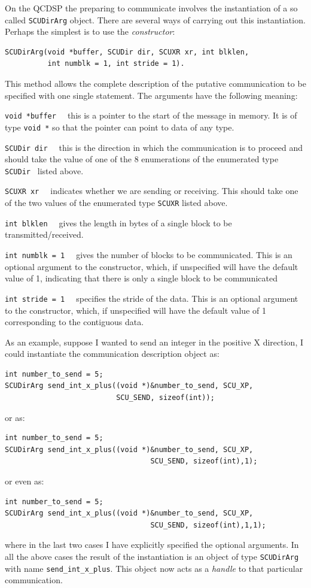 On the QCDSP the preparing to communicate involves the instantiation
of a so called {\tt SCUDirArg} object. There are several ways of
carrying out this instantiation. Perhaps the simplest is to use the
{\em constructor}: 
{\small \begin{verbatim} 
SCUDirArg(void *buffer, SCUDir dir, SCUXR xr, int blklen, 
          int numblk = 1, int stride = 1).
\end{verbatim}}
This method allows the complete description of the putative communication to be specified with one single statement. The arguments have the following meaning:
\begin{description}
\item{\tt void *buffer \ } 
this is a pointer to the start of the message in memory. It is of type {\tt void *} so that the pointer can point to data of any type. 
\item{\tt SCUDir dir \ } 
this is the direction in which the communication is to proceed and should take
the value of one of the 8 enumerations of the enumerated type {\tt SCUDir } listed above.
\item{\tt SCUXR xr \ } 
indicates whether we are sending or receiving. This should take one of the two 
values of the enumerated type {\tt SCUXR} listed above.
\item{\tt int blklen \ } 
gives the length in bytes of a single block to be transmitted/received.
\item{\tt int numblk = 1 \ }
gives the number of blocks to be communicated. This is an optional
argument to the constructor, which, if unspecified will have the
default value of 1, indicating that there is only a single block to be
communicated
\item{\tt int stride = 1 \ }
specifies the stride of the data. This is an optional argument to the constructor, which, if unspecified will have the default value of 1 corresponding to the 
contiguous data.
\end{description}

As an example, suppose I wanted to send an integer in the 
positive X direction, I could instantiate the communication description object as:
\begin{verbatim}
int number_to_send = 5;
SCUDirArg send_int_x_plus((void *)&number_to_send, SCU_XP, 
                          SCU_SEND, sizeof(int));
\end{verbatim}
or as:
\begin{verbatim}
int number_to_send = 5;
SCUDirArg send_int_x_plus((void *)&number_to_send, SCU_XP, 
                                  SCU_SEND, sizeof(int),1);
\end{verbatim}
or even as:
\begin{verbatim}
int number_to_send = 5;
SCUDirArg send_int_x_plus((void *)&number_to_send, SCU_XP, 
                                  SCU_SEND, sizeof(int),1,1);
\end{verbatim}
where in the last two cases I have explicitly specified the optional arguments.
In all the above cases the result of the instantiation is an
object of type {\tt SCUDirArg} with name {\tt send\_int\_x\_plus}. This object
now acts as a {\em handle} to that particular communication.

